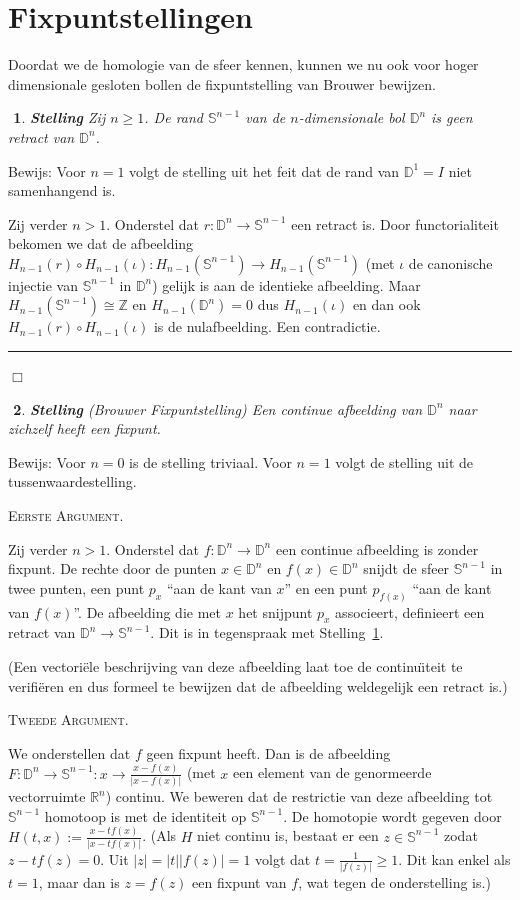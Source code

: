 \documentclass[12pt]{book}
\newcommand{\R}{\mathbb{R}}
\newcommand{\Z}{\mathbb{Z}}
\newcommand{\D}{\mathbb{D}}
\newcommand{\Sf}{\mathbb{S}}
\newcommand{\bew}{{\sc Bewijs: }}
\newcommand{\B}{\rule{1mm}{0mm} \hfill $\Box$ }
\newtheorem{stelh}{$\!\!$}[section]
\newenvironment{stel}{\begin{stelh}{\em {\bf Stelling }}}{\end{stelh}}
\begin{document}
\section{Fixpuntstellingen}

Doordat we de homologie van de sfeer kennen, kunnen we nu ook voor hoger dimensionale
gesloten bollen de fixpuntstelling van Brouwer bewijzen.

\begin{stel} Zij $n\geq 1$. De rand $\Sf^{n-1}$ van de $n$-dimensionale bol $\D^n$ is geen retract van $\D^n$.
\label{retract}
\end{stel}
\bew Voor $n=1$ volgt de stelling uit het feit dat de rand van $\D^1=I$ niet samenhangend is.

Zij verder $n>1$. Onderstel dat $r:\D^n\to \Sf^{n - 1}$  een retract is. Door functorialiteit bekomen
we dat de afbeelding $H_{n-1}(r)\circ H_{n-1}(\iota):H_{n-1}(\Sf^{n-1})\to H_{n-1}(\Sf^{n-1})$ (met $\iota$ de canonische injectie van $\Sf^{n-1}$ in $\D^n$) gelijk is aan de identieke afbeelding.
Maar $H_{n-1}(\Sf^{n-1})\cong \Z$ en $H_{n-1}(\D^n)=0$ dus $H_{n-1}(\iota)$ en dan ook $H_{n-1}(r)\circ H_{n-1}(\iota)$ is de nulafbeelding. Een contradictie. \B

\begin{stel} (Brouwer Fixpuntstelling)
Een continue afbeelding van $\D^n$ naar zichzelf heeft een fixpunt.
\end{stel}
\bew Voor $n=0$ is de stelling triviaal. Voor $n=1$ volgt de stelling uit de tussenwaardestelling.

\textsc{Eerste Argument.}

Zij verder $n>1$. Onderstel dat $f:\D^n\to \D^n$ een continue afbeelding is zonder fixpunt. 
De rechte door de punten $x\in \D^n$ en $f(x)\in \D^n$ snijdt de sfeer $\Sf^{n-1}$ in twee punten, een punt $p_x$ ``aan de kant van $x$'' en een punt $p_{f(x)}$ ``aan de kant van $f(x)$''. De afbeelding die met $x$ het snijpunt $p_x$ associeert, definieert een retract van $\D^n\to \Sf^{n-1}$. Dit is in tegenspraak met Stelling~\ref{retract}. 

(Een vectori\"ele beschrijving van deze afbeelding laat toe de continu\"{\i}teit te verifi\"eren en  dus formeel te bewijzen dat de afbeelding weldegelijk een retract is.)


\textsc{Tweede Argument.}

We onderstellen dat $f$ geen fixpunt heeft. Dan is de afbeelding $F: \D^n \to \Sf^{n-1}:x\to \frac{x-f(x)}{|x-f(x)|}$ (met $x$ een element van de genormeerde vectorruimte $\R^n$) continu. We beweren dat de restrictie van deze afbeelding tot $\Sf^{n-1}$ homotoop is met de identiteit op $\Sf^{n-1}$. De homotopie wordt gegeven door $H(t,x):=\frac{x-tf(x)}{|x-tf(x)|}$. (Als $H$ niet continu is, bestaat er een $z\in \Sf^{n-1}$ zodat $z-tf(z)=0$. Uit $|z|=|t||f(z)|=1$ volgt dat $t=\frac{1}{|f(z)|}\geq 1$. Dit kan enkel als $t=1$, maar dan is $z=f(z)$ een fixpunt van $f$, wat tegen de onderstelling is.)
\end{document}
